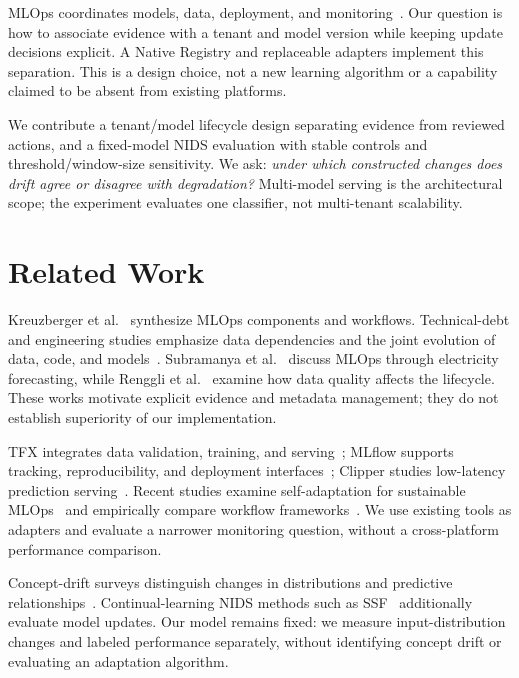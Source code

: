 \documentclass[runningheads]{llncs}
\begin{document}
MLOps coordinates models, data, deployment, and monitoring~\cite{kreuzberger2023mlops}. Our question is how to associate evidence with a tenant and model version while keeping update decisions explicit. A Native Registry and replaceable adapters implement this separation. This is a design choice, not a new learning algorithm or a capability claimed to be absent from existing platforms.

We contribute a tenant/model lifecycle design separating evidence from reviewed actions, and a fixed-model NIDS evaluation with stable controls and threshold/window-size sensitivity. We ask: \emph{under which constructed changes does drift agree or disagree with degradation?} Multi-model serving is the architectural scope; the experiment evaluates one classifier, not multi-tenant scalability.

\section{Related Work}
Kreuzberger et al.~\cite{kreuzberger2023mlops} synthesize MLOps components and workflows. Technical-debt and engineering studies emphasize data dependencies and the joint evolution of data, code, and models~\cite{sculley2015debt,amershi2019software}. Subramanya et al.~\cite{subramanya2022devops} discuss MLOps through electricity forecasting, while Renggli et al.~\cite{renggli2021data} examine how data quality affects the lifecycle. These works motivate explicit evidence and metadata management; they do not establish superiority of our implementation.

TFX integrates data validation, training, and serving~\cite{baylor2017tfx}; MLflow supports tracking, reproducibility, and deployment interfaces~\cite{mlflow}; Clipper studies low-latency prediction serving~\cite{crankshaw2017clipper}. Recent studies examine self-adaptation for sustainable MLOps~\cite{Bhatt2025HarmonE} and empirically compare workflow frameworks~\cite{MarcosMercade2026MLOpsFrameworks}. We use existing tools as adapters and evaluate a narrower monitoring question, without a cross-platform performance comparison.

Concept-drift surveys distinguish changes in distributions and predictive relationships~\cite{gama2014survey,webb2016drift}. Continual-learning NIDS methods such as SSF~\cite{Zhang2025SSFNIDS} additionally evaluate model updates. Our model remains fixed: we measure input-distribution changes and labeled performance separately, without identifying concept drift or evaluating an adaptation algorithm.
\end{document}
